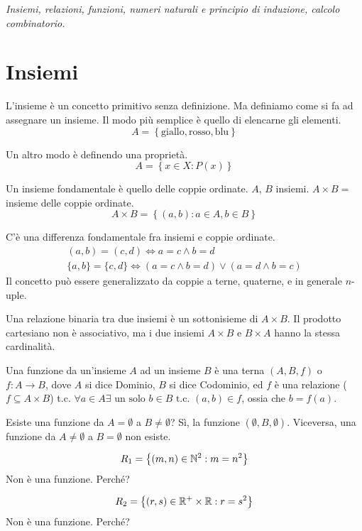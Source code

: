 \begin{center}
\indent
\textit{Insiemi, relazioni, funzioni, numeri naturali e principio di induzione, calcolo combinatorio.}
\end{center}

\section{Insiemi}

L'insieme \`e un concetto primitivo senza definizione. Ma definiamo come si fa ad assegnare un insieme. Il modo pi\`u semplice \`e quello di elencarne gli elementi. 
\[
A = \left\{ \text{giallo}, \text{rosso}, \text{blu} \right\}
\]

Un altro modo \`e definendo una propriet\`a.
\[
A = \left\{ x \in X : P(x) \right\}
\]

Un insieme fondamentale \`e quello delle coppie ordinate. $A$, $B$ insiemi. $A \times B =$ insieme delle coppie ordinate.
\[
A \times B = \left\{ (a,b) : a \in A, b \in B \right\}
\]

C'\`e una differenza fondamentale fra insiemi e coppie ordinate.
\begin{gather*}
(a,b) = (c,d) \iff a = c \land b = d \\
\{a,b\} = \{c,d\} \iff (a = c \land b = d) \lor (a = d \land b = c)
\end{gather*}
Il concetto pu\`o essere generalizzato da coppie a terne, quaterne, e in generale $n$-uple.

Una relazione binaria tra due insiemi \`e un sottonisieme di $A \times B$. Il prodotto cartesiano non \`e associativo, ma i due insiemi $A \times B$ e $B \times A$ hanno la stessa cardinalit\`a.

Una funzione da un'insieme $A$ ad un insieme $B$ \`e una terna $(A, B, f)$ o $f : A \to B$, dove $A$ si dice Dominio, $B$ si dice Codominio, ed $f$ \`e una relazione ($f \subseteq A \times B$) t.c. $\forall a \in A \exists \text{ un solo } b \in B \text{ t.c. } (a,b) \in f$, ossia che $b = f(a)$.

Esiste una funzione da $A = \emptyset$ a $B \neq \emptyset$? S\`i, la funzione $(\emptyset, B, \emptyset)$. Viceversa, una funzione da $A \neq \emptyset$ a $B = \emptyset$ non esiste.

\[
R_1 = \left\{ (m, n) \in \mathbb{N}^2 : m = n^2 \right\}
\]
Non \`e una funzione. Perch\'e? \vspace{3cm}

\[
R_2 = \left\{ (r, s) \in \mathbb{R}^+ \times \mathbb{R} : r = s^2 \right\}
\]
Non \`e una funzione. Perch\'e?
\vspace{3cm}

